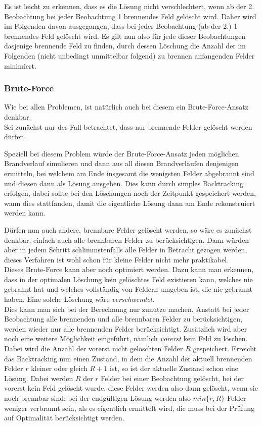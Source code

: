 Es ist leicht zu erkennen, dass es die Lösung nicht verschlechtert, wenn ab der 2. Beobachtung bei jeder Beobachtung 1 brennendes Feld gelöscht wird. Daher wird im Folgenden davon ausgegangen, dass bei jeder Beobachtung (ab der 2.) 1 brennendes Feld gelöscht wird. Es gilt nun also für jede dieser Beobachtungen dasjenige brennende Feld zu finden, durch dessen Löschung die Anzahl der im Folgenden (nicht unbedingt unmittelbar folgend) zu brennen anfangenden Felder minimiert.

\subsubsection*{Brute-Force}

Wie bei allen Problemen, ist natürlich auch bei diesem ein Brute-Force-Ansatz denkbar.\\
Sei zunächst nur der Fall betrachtet, dass nur brennende Felder gelöscht werden dürfen. 

Speziell bei diesem Problem würde der Brute-Force-Ansatz jeden möglichen Brandverlauf simulieren und dann aus all diesen Brandverläufen denjenigen ermitteln, bei welchem am Ende insgesamt die wenigsten Felder abgebrannt sind und diesen dann als Lösung ausgeben. Dies kann durch simples Backtracking erfolgen, dabei sollte bei den Löschungen noch der Zeitpunkt gespeichert werden, wann dies stattfanden, damit die eigentliche Lösung dann am Ende rekonstruiert werden kann.

Dürfen nun auch andere, brennbare Felder gelöscht werden, so wäre es zunächst denkbar, einfach auch alle brennbaren Felder zu berücksichtigen. Dann würden aber in jedem Schritt schlimmstenfalls alle Felder in Betracht gezogen werden, dieses Verfahren ist wohl schon für kleine Felder nicht mehr praktikabel. \\
Dieses Brute-Force kann aber noch optimiert werden. Dazu kann man erkennen, dass in der optimalen Löschung kein gelöschtes Feld existieren kann, welches nie gebrannt hat und welches vollständig von Feldern umgeben ist, die nie gebrannt haben. Eine solche Löschung wäre \emph{verschwendet}.\\
Dies kann man sich bei der Berechnung nur zunutze machen. Anstatt bei jeder Beobachtung alle brennenden und alle brennbaren Felder zu berücksichtigen, werden wieder nur alle brennenden Felder berücksichtigt. Zusätzlich wird aber noch eine weitere Möglichkeit eingeführt, nämlich \emph{vorerst} kein Feld zu löschen. Dabei wird die Anzahl der vorerst nicht gelöschten Felder $R$ gespeichert. Erreicht das Backtracking nun einen Zustand, in dem die Anzahl der aktuell brennenden Felder $r$ kleiner oder gleich $R + 1$ ist, so ist der aktuelle Zustand schon eine Lösung. Dabei werden $R$ der $r$ Felder bei einer Beobachtung gelöscht, bei der vorerst kein Feld gelöscht wurde, diese Felder werden also dann gelöscht, wenn sie noch brennbar sind; bei der endgültigen Lösung werden also $min\{r,R\}$ Felder weniger verbrannt sein, als es eigentlich ermittelt wird, die muss bei der Prüfung auf Optimalität berücksichtigt werden.
